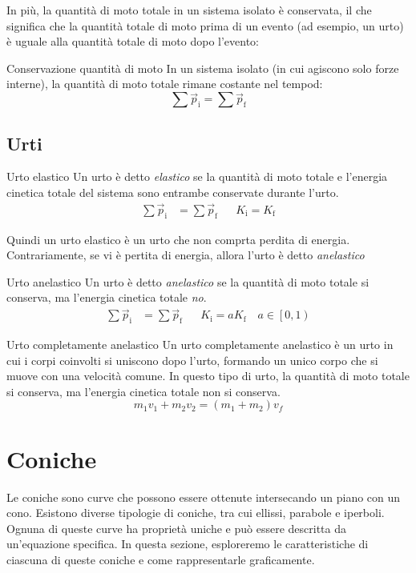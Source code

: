 In più, la quantità di moto totale in un sistema isolato è conservata, il che significa che la quantità totale di moto prima di un evento (ad esempio, un urto) è uguale alla quantità totale di moto dopo l'evento:
\begin{teorema}{Conservazione quantità di moto}
	In un sistema isolato (in cui agiscono solo forze interne), la quantità di moto totale rimane costante nel tempod:
	\[
		\sum \vec{p}_{\text{i}} = \sum \vec{p}_{\text{f}}
	\]
\end{teorema}

\subsection{Urti}
\begin{definizione}{Urto elastico}
	Un urto è detto \textit{elastico} se la quantità di moto totale e l'energia cinetica totale del sistema sono entrambe conservate durante l'urto.
	\begin{align*}
		\sum \vec{p}_{\text{i}} & = \sum \vec{p}_{\text{f}} &  & K_{\text{i}} = K_{\text{f}}
	\end{align*}
\end{definizione}
Quindi un urto elastico è un urto che non comprta perdita di energia. Contrariamente, se vi è pertita di energia, allora l'urto è detto \textit{anelastico}
\begin{definizione}{Urto anelastico}
	Un urto è detto \textit{anelastico} se la quantità di moto totale si conserva, ma l'energia cinetica totale \textit{no}.
	\begin{align*}
		\sum \vec{p}_{\text{i}} & = \sum \vec{p}_{\text{f}} &  & K_{\text{i}} = aK_{\text{f}} \quad a \in\left[0,1\right)
	\end{align*}
\end{definizione}
\begin{definizione}{Urto completamente anelastico}
	Un urto completamente anelastico è un urto in cui i corpi coinvolti si uniscono dopo l'urto, formando un unico corpo che si muove con una velocità comune. In questo tipo di urto, la quantità di moto totale si conserva, ma l'energia cinetica totale non si conserva.
	\[
		m_1 v_1 + m_2 v_2 = (m_1 + m_2) v_f
	\]


\end{definizione}

\section{Coniche}
Le coniche sono curve che possono essere ottenute intersecando un piano con un cono. Esistono diverse tipologie di coniche, tra cui ellissi, parabole e iperboli. Ognuna di queste curve ha proprietà uniche e può essere descritta da un'equazione specifica. In questa sezione, esploreremo le caratteristiche di ciascuna di queste coniche e come rappresentarle graficamente.


